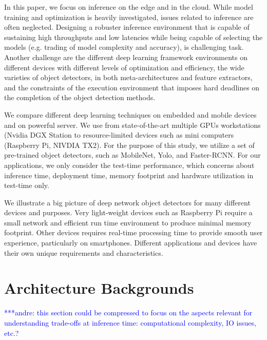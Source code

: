 \documentclass[conference]{IEEEtran}
\newcommand{\alnote}[1]{ {\textcolor{blue} { ***andre: #1 }}}
\newcommand{\alnote}[1]{}
\begin{document}
In this paper, we focus on inference on the edge and in the cloud. While model training and optimization is heavily investigated, issues related to inference are often neglected. Designing a robuster inference environment that is capable of sustaining high throughputs and low latencies while being capable of selecting the models (e.g. trading of model complexity and accuracy), is challenging task. Another challenge are the different deep learning framework environments on different devices with different levels of optimization and efficiency, the wide varieties of object detectors, in both meta-architectures and feature extractors, and the constraints of the execution environment that imposes hard deadlines on the completion of the object detection methods.

We compare different deep learning techniques on embedded and mobile devices and on powerful server.  We use from state-of-the-art multiple GPUs workstations (Nvidia DGX Station to resource-limited devices such as mini computers (Raspberry Pi, NIVDIA TX2). For the purpose of this study, we utilize a set of pre-trained object detectors, such as MobileNet, Yolo, and Faster-RCNN. For our applications, we only consider the test-time performance, which concerns about inference time, deployment time, memory footprint and hardware utilization in test-time only.






We illustrate a big picture of deep network object detectors for many different devices and purposes. Very light-weight devices such as Raspberry Pi require a small network and efficient run time environment to produce minimal memory footprint. Other devices requires real-time processing time to provide smooth user experience, particularly on smartphones. Different applications and devices have their own unique requirements and characteristics. 

\section{Architecture Backgrounds}

\alnote{this section could be compressed to focus on the aspects relevant for understanding trade-offs at inference time: computational complexity, IO issues, etc.?}
\end{document}
